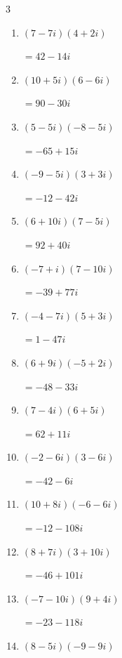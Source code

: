 \begin{multicols}{3}
\begin{enumerate}
  \item $\displaystyle (7-7i)(4+2i)$

        $\displaystyle =42-14i$

  \item $\displaystyle (10+5i)(6-6i)$

        $\displaystyle =90-30i$

  \item $\displaystyle (5-5i)(-8-5i)$

        $\displaystyle =-65+15i$

  \item $\displaystyle (-9-5i)(3+3i)$

        $\displaystyle =-12-42i$

  \item $\displaystyle (6+10i)(7-5i)$

        $\displaystyle =92+40i$

  \item $\displaystyle (-7+i)(7-10i)$

        $\displaystyle =-39+77i$

  \item $\displaystyle (-4-7i)(5+3i)$

        $\displaystyle =1-47i$

  \item $\displaystyle (6+9i)(-5+2i)$

        $\displaystyle =-48-33i$

  \item $\displaystyle (7-4i)(6+5i)$

        $\displaystyle =62+11i$

  \item $\displaystyle (-2-6i)(3-6i)$

        $\displaystyle =-42-6i$

  \item $\displaystyle (10+8i)(-6-6i)$

        $\displaystyle =-12-108i$

  \item $\displaystyle (8+7i)(3+10i)$

        $\displaystyle =-46+101i$

\columnbreak %

  \item $\displaystyle (-7-10i)(9+4i)$

        $\displaystyle =-23-118i$

  \item $\displaystyle (8-5i)(-9-9i)$


\end{enumerate}
\end{multicols}
